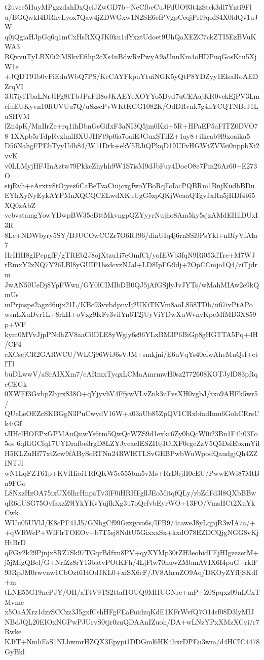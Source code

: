 t2uvce5HuyMPgzzdahDxQciJZwGD7b+NeCfbeCuJFdUO93t4zStck3dl7Ynti9Fl
u/BGQwkI4DRhvLyox7Qaw4jZDWGxw1N2SE6cfPVgpCcqjPrI9qofS4X0ldQv1uJW
q0jQgiaHJpGq6q1mCxHsRXQJK0ku1dYxztUdoet9UhQaXEZC7ckZTI5EzBVuKWA3
RQvvuTyLBX0i2iMSkvEfihp2cXs4uBdwRzPwyA9aUnnKm4oHDPuqGosKtu5XjW1e
+JQDT91b0vFiEduWbQ7PS/KcCAYFkpuYtuiNGK5yQtP8YDZyy1ElsaRoAEDZrqVI
3Ji7iylTbaLNrJIFg8tTbJPaFIl8oJKAEYeXOYYo5Dyd7uCEAajKR0vckEjPV3Lm
cfuEUKyvn10RUVUu7Q/u8zscPvWKtKGG1082K/OdDRvnk7g4hYCQTNBeJ1LuSHVM
lZn4pK/MnIlrZe+rq1ihDbnGsGiIxF3aNI3Q5jm0Kzi+5R+HPaEP5aFITZ0DVO78
1XXpb5rTdpRvzlmlBXUJHFt9p0ia7oaiEJGuxSTiIZ+1ay8+ilkcab9l9xoaika5
D56NahgFPEbTyyUdh84/W11Drk+ekV5BJiQPkqD19UFvHGWtZVVsi0nppbXi2vvK
v0LLMyjHFJInAztw79PkkcZhyhh9W1S7isM9dJbFuy4DocO8e7Pm26Ar60+E273O
stjRvh+eArxtx8tOjyez6CaBeTvaCiujcxgfwoYBoRqFoIacPQBRm1BnjKudhBDu
EYhXyNyEykAYPMnXQCQCELwdXKuUgG5zpQKjWcaaQTgvJxRn5jHDf4t65XQ0zAbZ
vcbvatamgYowYDwpBW35cBttMkvngpQZYyyrNujho8Am5ky5sjzAMdEHilDUxI3R
8Lc+NDWbyry5SY/BJUCOwCCZr7O6RJ96/dinUIq4j6rnSSi9PsYkl+nBfyVfAIa7
HrIHH8gIPcpgfF/gTREb2J8ojXtzu1i7eOmfCi/yoIEWb3fqN9Ri053dTre+M7WJ
rRmxY2zNQ7Y26LBl8yGUIF1hsdcxzNJal+LD8IpFG9dj+2OpCCmjo1Q4/ziTjdrm
JwAN50UeDj8YpFWwn/GY0lCIMIbDB0QJ5jAfGSjlyJvJYTs/wMahMIAw2e9kQmUs
mPrjnspe2agzd6ujx21L/KBc93vvbdpnvIj2UKiTKVm8aoLS58TDh/u67ivPtAPo
wsnLXuDvr1L+8rkH+oVxg9KFv3vilYn6T2jUyViYDwXuWvnyKpcMfMD3X859p+WF
kym0MVvJjpPNdhZV8aaCilDLE8yWgiy6s96YLxBM3P6BiGp8gHGTTA5Pq+4H/CF4
eXCscjCR2GARWCU/WLCj96WiJ6sVJM+smkjni/E6uVqYs40efwAheMuQsf+etITl
buDLwwV/aSrAIXXm7/eARmxTyqxLCMaAmrmwH0sz2772608KOTJylD83pRqcCEGk
0XWEf3GvbpZbjrx838O+qYjyvhV4FfywVLvZnk3nFvsXH0vgbJ/txo9AHFk5wr5/
QUeLeOEZcSKBGgN3PuCwydV16W+a03aUb85ZpQV1CRxbfadImu6GohCRrsUk4iGf
iJIHclHOEPxGPMAuQnwYs6tm5QwQcWZS9d1exkc6Zy0bQcW0i23Bn1F4h03Fo5os
6qRiGCfq17UYDrafbe3rgD8LZYJycaeIESZIItjIOlXF0egcZzV5Q5DsfEbxmYil
H5KLZuHf77xtZcw9fABySoRTNn24RWlETLSvGEBPwbWuWpodQaudgjQh4ZZINTJl
wN1LqFZT61p+KVfHioiTRfQKW5e555bm5vMs+RrDbjH0eEU/PwwEWi87MtBn9FGo
L8NxzHzOA75ixUX6lhrHnpaTv3lF0iHRHFgllJEoMitqfQLy/rbZdFd3l8QXbBBw
qR6dUSG75OvfaxzZ9lYkYKvYujfkXg3u7oQcfvbEyrWO+13FO/VmsHCt2XuYkCwk
WUu05UVlJ/K8cPF41J5/GNbgCf99Gzzjyvo6s/lFB9/4caweJ8yLqpjR3wIA7a/+
+qWRWeP+WlFlrTOEOv+b7T5sj8NdtU5GixxxSx+kxdO78EZDCQjgNGG8vKjHtBrD
qFGx2k29Pjnjx8RZ7Sk97TGqrBdfxu8PV+qyXYMp30tZH3eohidFEjHIgzezerM+
j5jMfgQBel/G+NrlZz8rY13batvPOtKFh/4LjFlw70huwZMbmAVIX6I4puG+rklF
93RpJM0rwvnw1CbOzt61tOdJKL0+xiSX6cF/JV8AhruZO9Aq/DKOyZYfIjSKdf+m
tLNE55G19ncPJY/OH/aTtV9TS2ttaf1OUQ9MHUGNrc+mP+Z0Spqxz09nLCxTMvme
x5OaAXrz1dzrSCCzz3J5gxfCshHFgFEaFuidzqKdE1KFrWvfQ7O14sf08D3lyMIJ
NBdJQL20EIOxNGPwPJUrvS0tjr0zuQDAAnIZuoh/DA+wLNzYPxXMzXCyi/r7Rwke
KJfT+NmhFaS1NLhwmrHZQX3Epypi1DDGml6HK4hxrDPEu3wm/d4HCIC4478GyBkl
